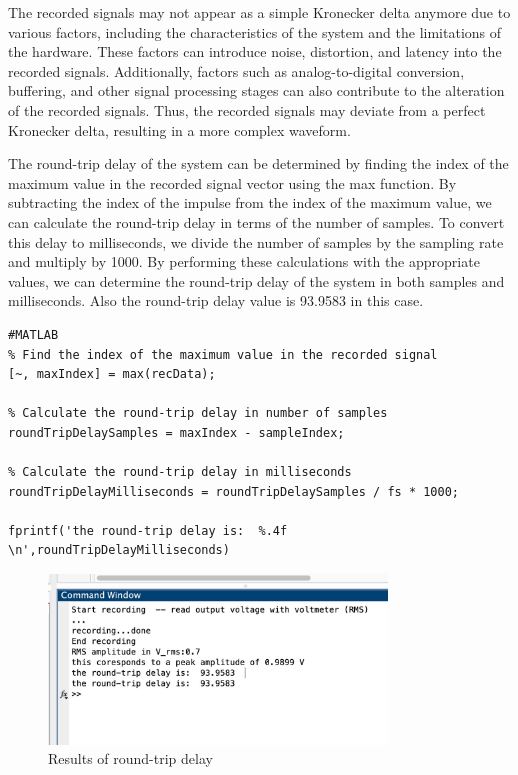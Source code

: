 \documentclass[
	a4paper,
	11pt,
]{article}
\begin{document}
The recorded signals may not appear as a simple Kronecker delta anymore due to various factors, including the characteristics of the system and the limitations of the hardware. These factors can introduce noise, distortion, and latency into the recorded signals. Additionally, factors such as analog-to-digital conversion, buffering, and other signal processing stages can also contribute to the alteration of the recorded signals. Thus, the recorded signals may deviate from a perfect Kronecker delta, resulting in a more complex waveform.

The round-trip delay of the system can be determined by finding the index of the maximum value in the recorded signal vector using the max function. By subtracting the index of the impulse from the index of the maximum value, we can calculate the round-trip delay in terms of the number of samples. To convert this delay to milliseconds, we divide the number of samples by the sampling rate and multiply by 1000. By performing these calculations with the appropriate values, we can determine the round-trip delay of the system in both samples and milliseconds. Also the round-trip delay value is 93.9583 in this case.

\begin{verbatim}
#MATLAB
% Find the index of the maximum value in the recorded signal
[~, maxIndex] = max(recData);

% Calculate the round-trip delay in number of samples
roundTripDelaySamples = maxIndex - sampleIndex;

% Calculate the round-trip delay in milliseconds
roundTripDelayMilliseconds = roundTripDelaySamples / fs * 1000;

fprintf('the round-trip delay is:  %.4f  \n',roundTripDelayMilliseconds)
\end{verbatim}

\begin{figure}[htb!]
    \centerline{\includegraphics[width=9cm]{3_img/3(c).jpg}}
     \caption[ Results of round-trip delay ]
        {\small Results of round-trip delay}
\end{figure}
\indent
\end{document}
